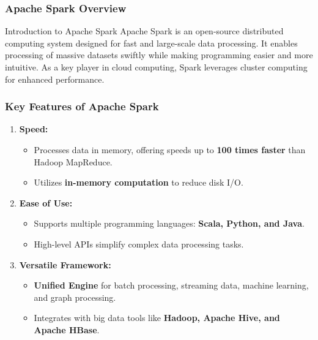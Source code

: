 \documentclass[aspectratio=169]{beamer}
\begin{document}
\begin{frame}[fragile]
    \frametitle{Apache Spark Overview}
    \begin{block}{Introduction to Apache Spark}
        Apache Spark is an open-source distributed computing system designed for fast and large-scale data processing. It enables processing of massive datasets swiftly while making programming easier and more intuitive. As a key player in cloud computing, Spark leverages cluster computing for enhanced performance.
    \end{block}
\end{frame}

\begin{frame}[fragile]
    \frametitle{Key Features of Apache Spark}
    \begin{enumerate}
        \item \textbf{Speed:}
        \begin{itemize}
            \item Processes data in memory, offering speeds up to \textbf{100 times faster} than Hadoop MapReduce.
            \item Utilizes \textbf{in-memory computation} to reduce disk I/O.
        \end{itemize}
        
        \item \textbf{Ease of Use:}
        \begin{itemize}
            \item Supports multiple programming languages: \textbf{Scala, Python, and Java}.
            \item High-level APIs simplify complex data processing tasks.
        \end{itemize}

        \item \textbf{Versatile Framework:}
        \begin{itemize}
            \item \textbf{Unified Engine} for batch processing, streaming data, machine learning, and graph processing.
            \item Integrates with big data tools like \textbf{Hadoop, Apache Hive, and Apache HBase}.
        \end{itemize}
    \end{enumerate}
\end{frame}
\end{document}
